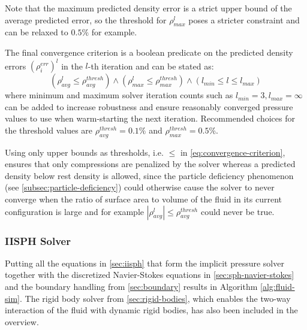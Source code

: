\documentclass[oneside, a4paper]{book}
\newcommand\abs[1]{\left|#1\right|}
\newcommand\br[1]{\left(#1\right)}
\begin{document}
  Note that the maximum predicted density error is a strict upper bound of the average predicted error, so the threshold for $\rho^{l}_{max}$ poses a stricter constraint and can be relaxed to $0.5\%$ for example.

  The final convergence criterion is a boolean predicate on the predicted density errors $\br{\rho_i^{err}}^l$ in the $l$-th iteration and can be stated as:
  \begin{equation}
    \br{\rho^l_{avg} \leq \rho^{thresh}_{avg}}
    \land \br{\rho^l_{max} \leq \rho^{thresh}_{max}}
    \land \br{l_{min} \leq l \leq l_{max}}
    \label{eq:convergence-criterion}
  \end{equation}
  where minimum and maximum solver iteration counts such as $l_{min}=3, l_{max}=\infty$ can be added to increase robustness and ensure reasonably converged pressure values to use when warm-starting the next iteration. Recommended choices for the threshold values are $\rho^{thresh}_{avg}=0.1\%$ \autocite{iisph} and $\rho^{thresh}_{max}=0.5\%$.

  Using only upper bounds as thresholds, i.e. $\leq$ in \autoref{eq:convergence-criterion}, ensures that only compressions are penalized by the solver whereas a predicted density below rest density is allowed, since the particle deficiency phenomenon (see \autoref{subsec:particle-deficiency}) could otherwise cause the solver to never converge when the ratio of surface area to volume of the fluid in its current configuration is large and for example $\abs{\rho^l_{avg}} \leq \rho^{thresh}_{avg}$ could never be true. 


  \subsubsection{IISPH Solver}\label{subsec:iisph-solver}
  Putting all the equations in \autoref{sec:iisph} that form the implicit pressure solver together with the discretized Navier-Stokes equations in \autoref{sec:sph-navier-stokes} and the boundary handling from \autoref{sec:boundary} results in Algorithm \ref{alg:fluid-sim}. 
  The rigid body solver from \autoref{sec:rigid-bodies}, which enables the two-way interaction of the fluid with dynamic rigid bodies, has also been included in the overview.
\end{document}
